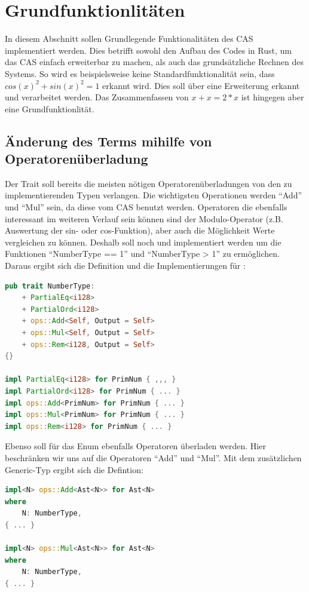 \documentclass[11pt,a4paper, ngerman]{article}
\begin{document}
\newpage

\section{Grundfunktionlitäten}
In diesem Abschnitt sollen Grundlegende Funktionalitäten des CAS implementiert werden. Dies betrifft sowohl den Aufbau des Codes in Rust, um das CAS einfach erweiterbar zu machen, als auch das grundsätzliche Rechnen des Systems. So wird es beispielsweise keine Standardfunktionalität sein, dass $cos(x)^2+sin(x)^2 = 1$ erkannt wird. Dies soll über eine Erweiterung erkannt und verarbeitet werden. Das Zusammenfassen von $x+x=2*x$ ist hingegen aber eine Grundfunktionlität.

\subsection{Änderung des Terms mihilfe von Operatorenüberladung}
Der Trait  soll bereits die meisten nötigen Operatorenüberladungen von den zu implementierenden Typen verlangen. Die wichtigsten Operationen werden ``Add'' und ``Mul'' sein, da diese vom CAS benutzt werden. Operatoren die ebenfalls interessant im weiteren Verlauf sein können sind der Modulo-Operator (z.B. Auswertung der sin- oder cos-Funktion), aber auch die Möglichkeit Werte vergleichen zu können. Deshalb soll noch  und  implementiert werden um die Funktionen ``NumberType == 1'' und ``NumberType > 1'' zu ermöglichen. Daraus ergibt sich die Definition und die Implementierungen für :

\begin{lstlisting}[language=rust, caption={trait NumberType 1. Iteration}]
pub trait NumberType:
    + PartialEq<i128>
    + PartialOrd<i128>
    + ops::Add<Self, Output = Self>
    + ops::Mul<Self, Output = Self>
    + ops::Rem<i128, Output = Self>
{}

impl PartialEq<i128> for PrimNum { ,,, }
impl PartialOrd<i128> for PrimNum { ... }
impl ops::Add<PrimNum> for PrimNum { ... }
impl ops::Mul<PrimNum> for PrimNum { ... }
impl ops::Rem<i128> for PrimNum { ... }
\end{lstlisting}

Ebenso soll für das Enum  ebenfalls Operatoren überladen werden. Hier beschränken wir uns auf die Operatoren ``Add'' und ``Mul''. Mit dem zusätzlichen Generic-Typ ergibt sich die Defintion:

\begin{lstlisting}[language=rust, caption={Ast Operatorenüberladung}]
impl<N> ops::Add<Ast<N>> for Ast<N>
where
    N: NumberType,
{ ... }

impl<N> ops::Mul<Ast<N>> for Ast<N>
where
    N: NumberType,
{ ... }
\end{lstlisting}
\end{document}
